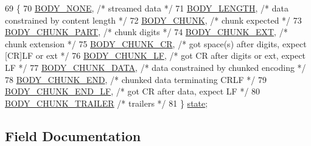 \begin{DoxyCode}
69     \{
70         \hyperlink{structhttp__filter__ctx_aa3159b475aeee8e103259d1c95a334e8abd8ab22b23c1ff942a54ee9f06902cbe}{BODY\_NONE}, \textcolor{comment}{/* streamed data */}
71         \hyperlink{structhttp__filter__ctx_aa3159b475aeee8e103259d1c95a334e8aacae14c4226756b705f90bc4edbdcf6a}{BODY\_LENGTH}, \textcolor{comment}{/* data constrained by content length */}
72         \hyperlink{structhttp__filter__ctx_aa3159b475aeee8e103259d1c95a334e8aaf0a69d71f0f7631f6944789ffe81738}{BODY\_CHUNK}, \textcolor{comment}{/* chunk expected */}
73         \hyperlink{structhttp__filter__ctx_aa3159b475aeee8e103259d1c95a334e8a5e2a4bae5c5d9f5d4f6d0212e3260e2f}{BODY\_CHUNK\_PART}, \textcolor{comment}{/* chunk digits */}
74         \hyperlink{structhttp__filter__ctx_aa3159b475aeee8e103259d1c95a334e8a408d3b74294cdc5a8be6c67abf8c6183}{BODY\_CHUNK\_EXT}, \textcolor{comment}{/* chunk extension */}
75         \hyperlink{structhttp__filter__ctx_aa3159b475aeee8e103259d1c95a334e8aeb24c50e5c4248563512a8c09e6fa1fb}{BODY\_CHUNK\_CR}, \textcolor{comment}{/* got space(s) after digits, expect [CR]LF or ext */}
76         \hyperlink{structhttp__filter__ctx_aa3159b475aeee8e103259d1c95a334e8af5e3abb711e1c2e2d4ed1a18b4ff29e6}{BODY\_CHUNK\_LF}, \textcolor{comment}{/* got CR after digits or ext, expect LF */}
77         \hyperlink{structhttp__filter__ctx_aa3159b475aeee8e103259d1c95a334e8adf1346fa548e4fa5e3d0cfe1b897674d}{BODY\_CHUNK\_DATA}, \textcolor{comment}{/* data constrained by chunked encoding */}
78         \hyperlink{structhttp__filter__ctx_aa3159b475aeee8e103259d1c95a334e8a887476948904160a7e5c664d9ab0d9c1}{BODY\_CHUNK\_END}, \textcolor{comment}{/* chunked data terminating CRLF */}
79         \hyperlink{structhttp__filter__ctx_aa3159b475aeee8e103259d1c95a334e8a6069fef627be035a8cc17783de3babb4}{BODY\_CHUNK\_END\_LF}, \textcolor{comment}{/* got CR after data, expect LF */}
80         \hyperlink{structhttp__filter__ctx_aa3159b475aeee8e103259d1c95a334e8ae2d79e740da9b93106e9ce02c88d0068}{BODY\_CHUNK\_TRAILER} \textcolor{comment}{/* trailers */}
81     \} \hyperlink{structhttp__filter__ctx_a2e84a1c737dd4daa565b328c875402cb}{state};
\end{DoxyCode}


\subsection{Field Documentation}
